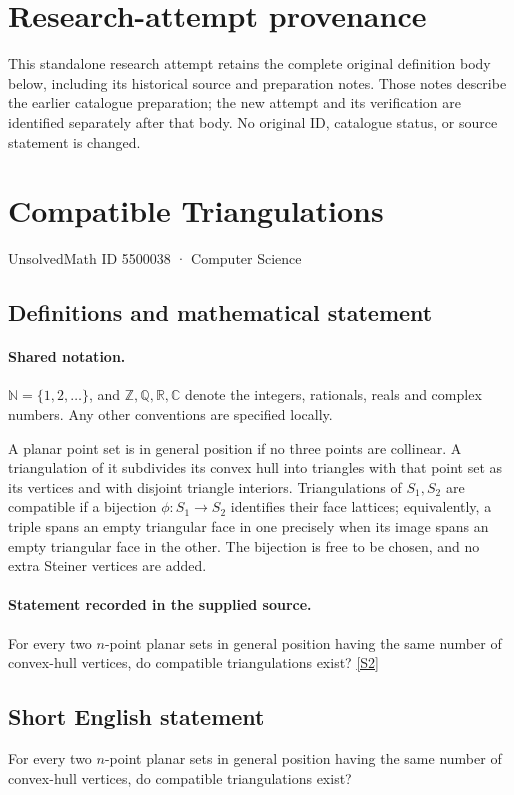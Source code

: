 \documentclass[11pt]{article}
\begin{document}
\section*{Research-attempt provenance}
This standalone research attempt retains the complete original definition body below,
including its historical source and preparation notes. Those notes describe the
earlier catalogue preparation; the new attempt and its verification are identified
separately after that body. No original ID, catalogue status, or source statement is changed.

\section{Compatible Triangulations}\label{5500038}
{\small UnsolvedMath ID 5500038 · Computer Science}
\subsection{Definitions and mathematical statement}

\paragraph{Shared notation.}$\mathbb N=\{1,2,\ldots\}$, and $\mathbb Z,\mathbb Q,\mathbb R,\mathbb C$ denote the integers, rationals, reals and complex numbers. Any other conventions are specified locally.


A planar point set is in general position if no three points are collinear. A triangulation of it subdivides its convex hull into triangles with that point set as its vertices and with disjoint triangle interiors. Triangulations of $S_1,S_2$ are compatible if a bijection $\phi:S_1\to S_2$ identifies their face lattices; equivalently, a triple spans an empty triangular face in one precisely when its image spans an empty triangular face in the other. The bijection is free to be chosen, and no extra Steiner vertices are added.
\paragraph{Statement recorded in the supplied source.}
For every two $n$-point planar sets in general position having the same number of convex-hull vertices, do compatible triangulations exist? \href{https://github.com/edemaine/topp/blob/main/Problems/P.000038}{[S2]}
\subsection{Short English statement}
For every two $n$-point planar sets in general position having the same number of convex-hull vertices, do compatible triangulations exist?
\end{document}
